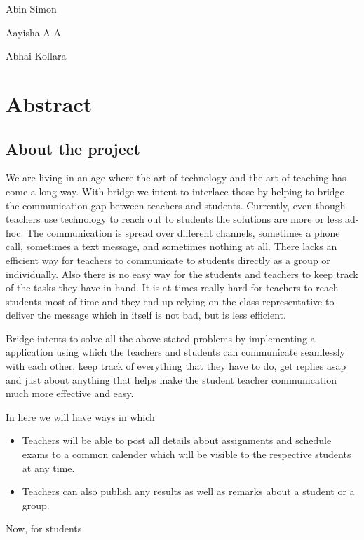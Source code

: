 \documentclass{article}
\begin{document}
\vspace{5em}

\begin{minipage}[b]{0.33333\textwidth}
\raggedright
Abin Simon
\end{minipage}%
\begin{minipage}[b]{0.33333\textwidth}
\centering
Aayisha A A
\end{minipage}%
\begin{minipage}[b]{0.33333\textwidth}
\raggedleft
Abhai Kollara
\end{minipage}

\newpage

\section{Abstract}
\vspace{1em}
\subsection{About the project}

We are living in an age where the art of technology and the art of teaching has come a long way. With bridge we intent to interlace those by helping to bridge the communication gap between teachers and students. Currently, even though teachers use technology to reach out to students the solutions are more or less ad-hoc. The communication is spread over different channels, sometimes a phone call, sometimes a text message, and sometimes nothing at all. There lacks an efficient way for teachers to communicate to students directly as a group or individually. Also there is no easy way for the students and teachers to keep track of the tasks they have in hand. It is at times really hard for teachers to reach students most of time and they end up relying on the class representative to deliver the message which in itself is not bad, but is less efficient.

Bridge intents to solve all the above stated problems by implementing a application using which the teachers and students can communicate seamlessly with each other, keep track of everything that they have to do, get replies asap and just about anything that helps make the student teacher communication much more effective and easy.

In here we will have ways in which
\begin{itemize}
\item Teachers will be able to post all details about assignments and schedule exams to a common calender which will be visible to the respective students at any time.
\item Teachers can also publish any results as well as remarks about a student or a group.
\end{itemize}
Now, for students
\end{document}
